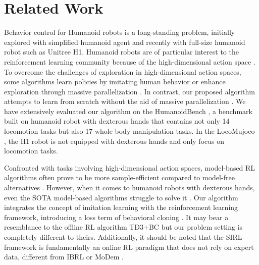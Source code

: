 \section{Related Work}
Behavior control for Humanoid robots is a long-standing problem, initially explored with simplified humanoid agent \citep{tunyasuvunakool2020dm_control} and recently with full-size humanoid robot \citep{zhuang2024humanoid,fu2024humanplus} such as Unitree H1.
Humanoid robots are of particular interest to the reinforcement learning community because of the high-dimensional action space \citep{merel2017learning, hansen2022temporal, hansen2023td, hansen2024hierarchical}.
To overcome the challenges of exploration in high-dimensional action spaces, some algorithms learn policies by imitating human behavior \citep{fu2024humanplus} or enhance exploration through massive parallelization \citep{zhuang2024humanoid}.
In contrast, our proposed algorithm attempts to learn from scratch without the aid of massive parallelization \citep{makoviychuk2021isaac}. 
We have extensively evaluated our algorithm on the HumanoidBench \citep{sferrazza2024humanoidbench}, a benchmark built on humanoid robot with dexterous hands \citep{menagerie2022github} that contains not only  14 locomotion tasks but also  17 whole-body manipulation tasks.
In the LocoMujoco \citep{al2023locomujoco}, the H1 robot is not equipped with dexterous hands and only focus on locomotion tasks.

Confronted with tasks involving high-dimensional action spaces, model-based RL algorithms \citep{ha2018recurrent, hansen2022temporal, hafner2023mastering, hafner2019dream} often prove to be more sample-efficient compared to model-free alternatives \citep{haarnoja2018soft, fujimoto2018addressing}. 
However, when it comes to humanoid robots with dexterous hands, even the SOTA model-based algorithms struggle to solve it \citep{sferrazza2024humanoidbench}. 
Our algorithm integrates the concept of imitation learning \citep{liu2023ceil, zhang2024context} with the reinforcement learning framework, introducing a loss term of behavioral cloning \citep{pomerleau1988alvinn}.  It may bear a  resemblance to the offline RL \citep{zhuang2024reinformer, fujimoto2019off} algorithm TD3+BC \citep{fujimoto2021minimalist} but our problem setting is   completely different to theirs.
Additionally, it should be noted that the SIRL framework is fundamentally an online RL paradigm that does not rely on expert data, different from IBRL \citep{hu2023imitation} or MoDem \citep{hansen2022modem}.

